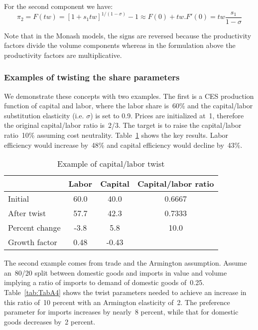 \noindent For the second component we have:
\begin{displaymath}
\pi_2=F(tw) = \left[ {1+s_1 tw} \right]^{1/(1-\sigma)}-1 \approx F(0) + tw.F'(0)=tw\frac{s_1}{1-\sigma}
\end{displaymath}

\noindent Note that in the Monash models, the signs are reversed because the productivity factors divide the volume components whereas in the formulation above the productivity factors are multiplicative.

\subsubsection{Examples of twisting the share parameters}

We demonstrate these concepts with two examples. The first is a CES production function of
capital and labor, where the labor share is~60\% and
the capital/labor substitution elasticity (i.e. $\sigma$) is set to 0.9. Prices are initialized at~1, therefore the
original capital/labor ratio is~2/3. The target is to raise the capital/labor ratio~10\% assuming
cost neutrality. Table~\ref{tab:TabA3} shows the key results. Labor efficiency would increase
by~48\% and capital efficiency would decline by~43\%.

\begin{table}[ht]
\centering
\caption{Example of capital/labor twist}
\label{tab:TabA3}
\begin{tabular}{l c c c}
\hline
{} & Labor & Capital & Capital/labor ratio \\
\hline
\hline
Initial & 60.0 & 40.0 & 0.6667 \\
After twist & 57.7 & 42.3 & 0.7333 \\
Percent change & -3.8 & 5.8 & 10.0 \\
Growth factor & 0.48 & -0.43 & {} \\
\hline
\end{tabular}
\end{table}

The second example comes from trade and the Armington assumption. Assume an~80/20 split
between domestic goods and imports in value and volume implying a ratio of imports to
demand of domestic goods of~0.25. Table~\ref{tab:TabA4} shows the twist parameters needed to
achieve an increase in this ratio of~10 percent with an Armington elasticity of~2. The preference
parameter for imports increases by nearly~8 percent, while that for domestic goods decreases by~2
percent.

